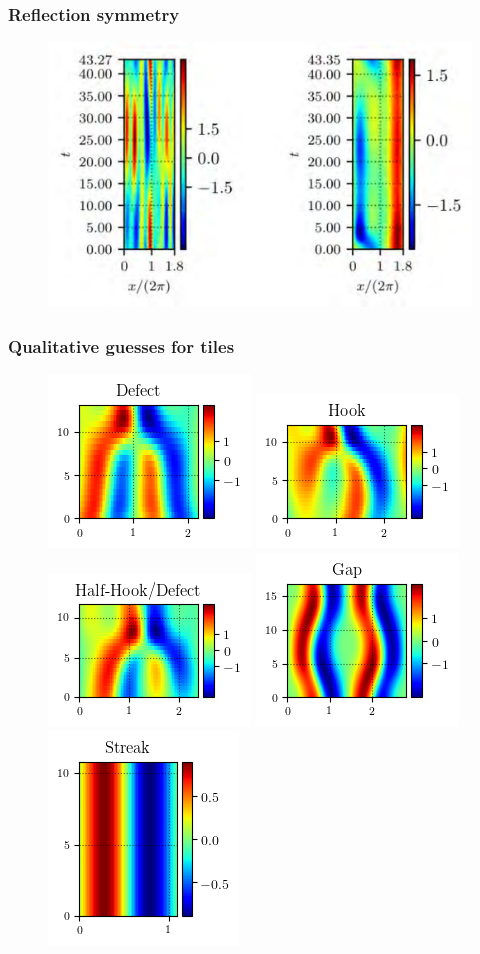 \documentclass[mathserif, handout]{beamer}
\begin{document}
\begin{frame}%
  \frametitle{Reflection symmetry}
  \begin{figure}
  \includegraphics[width=.9\textwidth]{ANTI_IF}
  \end{figure}
\end{frame}

\begin{frame}%
  \frametitle{Qualitative guesses for tiles}
  \begin{figure}
  \includegraphics[width=.2\textwidth]{MNG_defect}
  \includegraphics[width=.2\textwidth]{MNG_hook}
  \includegraphics[width=.2\textwidth]{MNG_half}
  \includegraphics[width=.2\textwidth]{MNG_gap}
  \includegraphics[width=.2\textwidth]{MNG_streak}
  \end{figure}
\end{frame}
\end{document}
